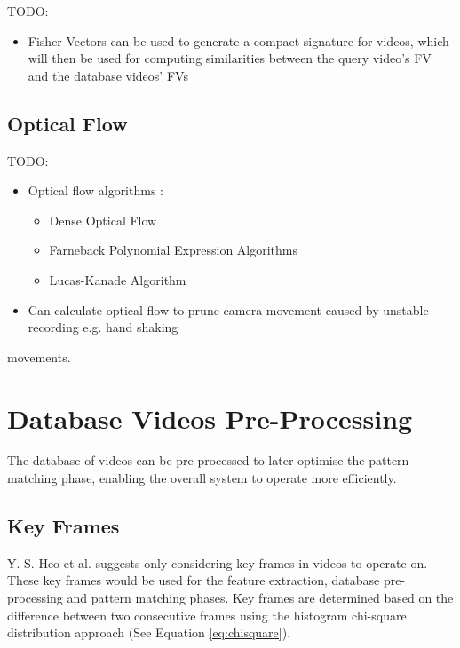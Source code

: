 \documentclass[11pt,openany,a4paper]{article}
\begin{document}
TODO:
\begin{itemize}
    \item Fisher Vectors can be used to generate a compact signature for videos, which will then be used for computing similarities between the query video's FV and the database videos' FVs \cite{araujo2017i2v}
\end{itemize}


\subsection{Optical Flow}
\label{sec:optical-flow}

TODO:
\begin{itemize}
    \item Optical flow algorithms \cite{bradski2008opencv}:
    \begin{itemize}
        \item Dense Optical Flow
        \item Farneback Polynomial Expression Algorithms
        \item Lucas-Kanade Algorithm
    \end{itemize}
    \item Can calculate optical flow to prune camera movement caused by unstable recording e.g. hand shaking \cite{wang2016actionregonition}
\end{itemize} movements.


\clearpage \section{Database Videos Pre-Processing}

The database of videos can be pre-processed to later optimise the pattern matching phase, enabling the overall system to operate more efficiently.


\subsection{Key Frames}
\label{sec:key-frames}

Y. S. Heo et al. \cite{heo2016colortransfer} suggests only considering key frames in videos to operate on. These key frames would be used for the feature extraction, database pre-processing and pattern matching phases. Key frames are determined based on the difference between two consecutive frames using the histogram chi-square distribution approach (See Equation \ref{eq:chisquare}).\\
\end{document}

